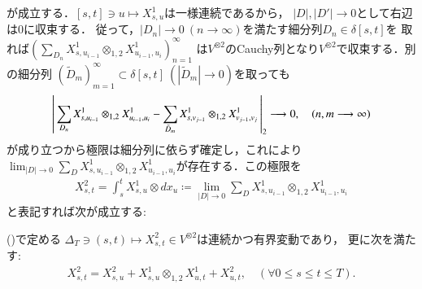	が成立する．$[s,t] \ni u \longmapsto X^1_{s,u}$は一様連続であるから，
	$|D|,|D'|\longrightarrow 0$として右辺は0に収束する．
	従って，$|D_n| \longrightarrow 0\ (n \longrightarrow \infty)$を満たす細分列$D_n \in \delta[s,t]$を
	取れば$\left(\sum_{D_n} X^1_{s,u_{i-1}} \otimes_{1,2} X^1_{u_{i-1},u_i} \right)_{n=1}^{\infty}$
	は$V^{\otimes 2}$のCauchy列となり$V^{\otimes 2}$で収束する．別の細分列
	$(\tilde{D}_m)_{m=1}^{\infty} \subset \delta[s,t]\ (|\tilde{D}_m| \longrightarrow 0)$を取っても
	\begin{align}
		\left|\,  \sum_{D_n} X^1_{s,u_{i-1}} \otimes_{1,2} X^1_{u_{i-1},u_i} - 
			\sum_{\tilde{D}_m} X^1_{s,v_{j-1}} \otimes_{1,2} X^1_{v_{j-1},v_j}\, \right|_{2}
		\longrightarrow 0,
		\quad (n,m \longrightarrow \infty)
	\end{align}
	が成り立つから極限は細分列に依らず確定し，これにより
	$\lim_{|D| \to 0} \sum_{D} X^1_{s,u_{i-1}} \otimes_{1,2} X^1_{u_{i-1},u_i}$が存在する．この極限を
	\begin{align}
		X^2_{s,t} = \int_s^t X^1_{s,u} \otimes d x_u \coloneqq 
		\lim_{|D| \to 0} \sum_{D} X^1_{s,u_{i-1}} \otimes_{1,2} X^1_{u_{i-1},u_i}
		\label{eq:signature_of_path_1}
	\end{align}
	と表記すれば次が成立する:
	
	\begin{screen}
		\begin{thm}
			()で定める
			$\Delta_T \ni (s,t) \longmapsto X^2_{s,t} \in V^{\otimes 2}$は連続かつ有界変動であり，
			更に次を満たす:
			\begin{align}
				X^2_{s,t} = X^2_{s,u} + X^1_{s,u} \otimes_{1,2} X^1_{u,t} + X^2_{u,t},
				\quad (\forall 0 \leq s \leq t \leq T).
				\label{eq:signature_of_path_2}
			\end{align}
		\end{thm}
	\end{screen}
	
